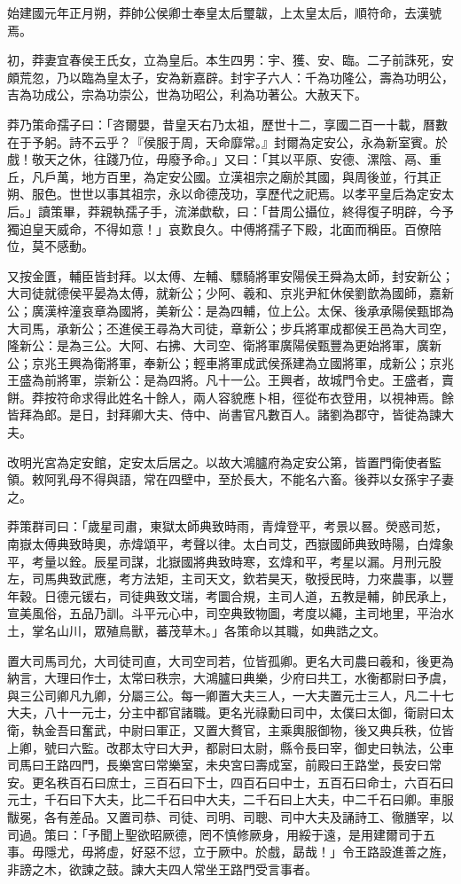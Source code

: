 \begin{pinyinscope}
始建國元年正月朔，莽帥公侯卿士奉皇太后璽韍，上太皇太后，順符命，去漢號焉。

初，莽妻宜春侯王氏女，立為皇后。本生四男：宇、獲、安、臨。二子前誅死，安頗荒忽，乃以臨為皇太子，安為新嘉辟。封宇子六人：千為功隆公，壽為功明公，吉為功成公，宗為功崇公，世為功昭公，利為功著公。大赦天下。

莽乃策命孺子曰：「咨爾嬰，昔皇天右乃太祖，歷世十二，享國二百一十載，曆數在于予躬。詩不云乎？『侯服于周，天命靡常。』封爾為定安公，永為新室賓。於戲！敬天之休，往踐乃位，毋廢予命。」又曰：「其以平原、安德、漯陰、鬲、重丘，凡戶萬，地方百里，為定安公國。立漢祖宗之廟於其國，與周後並，行其正朔、服色。世世以事其祖宗，永以命德茂功，享歷代之祀焉。以孝平皇后為定安太后。」讀策畢，莽親執孺子手，流涕歔欷，曰：「昔周公攝位，終得復子明辟，今予獨迫皇天威命，不得如意！」哀歎良久。中傅將孺子下殿，北面而稱臣。百僚陪位，莫不感動。

又按金匱，輔臣皆封拜。以太傅、左輔、驃騎將軍安陽侯王舜為太師，封安新公；大司徒就德侯平晏為太傅，就新公；少阿、羲和、京兆尹紅休侯劉歆為國師，嘉新公；廣漢梓潼哀章為國將，美新公：是為四輔，位上公。太保、後承承陽侯甄邯為大司馬，承新公；丕進侯王尋為大司徒，章新公；步兵將軍成都侯王邑為大司空，隆新公：是為三公。大阿、右拂、大司空、衛將軍廣陽侯甄豐為更始將軍，廣新公；京兆王興為衛將軍，奉新公；輕車將軍成武侯孫建為立國將軍，成新公；京兆王盛為前將軍，崇新公：是為四將。凡十一公。王興者，故城門令史。王盛者，賣餅。莽按符命求得此姓名十餘人，兩人容貌應卜相，徑從布衣登用，以視神焉。餘皆拜為郎。是日，封拜卿大夫、侍中、尚書官凡數百人。諸劉為郡守，皆徙為諫大夫。

改明光宮為定安館，定安太后居之。以故大鴻臚府為定安公第，皆置門衛使者監領。敕阿乳母不得與語，常在四壁中，至於長大，不能名六畜。後莽以女孫宇子妻之。

莽策群司曰：「歲星司肅，東獄太師典致時雨，青煒登平，考景以晷。熒惑司悊，南嶽太傅典致時奧，赤煒頌平，考聲以律。太白司艾，西嶽國師典致時陽，白煒象平，考量以銓。辰星司謀，北嶽國將典致時寒，玄煒和平，考星以漏。月刑元股左，司馬典致武應，考方法矩，主司天文，欽若昊天，敬授民時，力來農事，以豐年穀。日德元锾右，司徒典致文瑞，考圜合規，主司人道，五教是輔，帥民承上，宣美風俗，五品乃訓。斗平元心中，司空典致物圖，考度以繩，主司地里，平治水土，掌名山川，眾殖鳥獸，蕃茂草木。」各策命以其職，如典誥之文。

置大司馬司允，大司徒司直，大司空司若，位皆孤卿。更名大司農曰羲和，後更為納言，大理曰作士，太常曰秩宗，大鴻臚曰典樂，少府曰共工，水衡都尉曰予虞，與三公司卿凡九卿，分屬三公。每一卿置大夫三人，一大夫置元士三人，凡二十七大夫，八十一元士，分主中都官諸職。更名光祿勳曰司中，太僕曰太御，衛尉曰太衛，執金吾曰奮武，中尉曰軍正，又置大贅官，主乘輿服御物，後又典兵秩，位皆上卿，號曰六監。改郡太守曰大尹，都尉曰太尉，縣令長曰宰，御史曰執法，公車司馬曰王路四門，長樂宮曰常樂室，未央宮曰壽成室，前殿曰王路堂，長安曰常安。更名秩百石曰庶士，三百石曰下士，四百石曰中士，五百石曰命士，六百石曰元士，千石曰下大夫，比二千石曰中大夫，二千石曰上大夫，中二千石曰卿。車服黻冕，各有差品。又置司恭、司徒、司明、司聰、司中大夫及誦詩工、徹膳宰，以司過。策曰：「予聞上聖欲昭厥德，罔不慎修厥身，用綏于遠，是用建爾司于五事。毋隱尤，毋將虛，好惡不愆，立于厥中。於戲，勗哉！」令王路設進善之旌，非謗之木，欲諫之鼓。諫大夫四人常坐王路門受言事者。


\end{pinyinscope}
